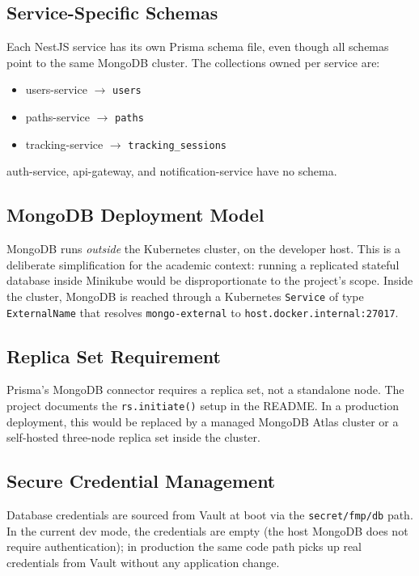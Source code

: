 \documentclass[11pt,a4paper]{article}
\begin{document}
\subsection{Service-Specific Schemas}
Each NestJS service has its own Prisma schema file, even though all
schemas point to the same MongoDB cluster.  The collections owned per
service are:

\begin{itemize}[leftmargin=*]
  \item users-service $\rightarrow$ \texttt{users}
  \item paths-service $\rightarrow$ \texttt{paths}
  \item tracking-service $\rightarrow$ \texttt{tracking\_sessions}
\end{itemize}

auth-service, api-gateway, and notification-service have no schema.

\subsection{MongoDB Deployment Model}
MongoDB runs \emph{outside} the Kubernetes cluster, on the developer
host.  This is a deliberate simplification for the academic context:
running a replicated stateful database inside Minikube would be
disproportionate to the project's scope.  Inside the cluster,
MongoDB is reached through a Kubernetes \texttt{Service} of type
\texttt{ExternalName} that resolves \texttt{mongo-external} to
\texttt{host.docker.internal:27017}.

\subsection{Replica Set Requirement}
Prisma's MongoDB connector requires a replica set, not a standalone
node.  The project documents the \texttt{rs.initiate()} setup in the
README.  In a production deployment, this would be replaced by a
managed MongoDB Atlas cluster or a self-hosted three-node replica set
inside the cluster.

\subsection{Secure Credential Management}
Database credentials are sourced from Vault at boot via the
\texttt{secret/fmp/db} path.  In the current dev mode, the credentials
are empty (the host MongoDB does not require authentication); in
production the same code path picks up real credentials from Vault
without any application change.
\end{document}
